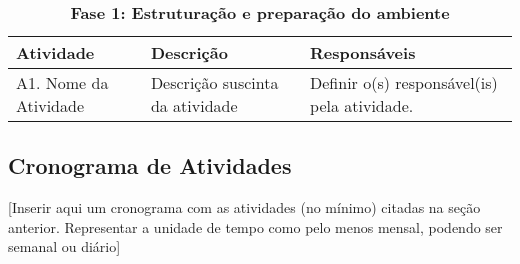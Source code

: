 \begin{table}[htbp]
\centering
\caption{\textbf{Fase 1: Estruturação e preparação do ambiente}}
\begin{tabular}{|p{2.5cm}|p{10cm}|p{2.5cm}|}
\hline
\textbf{Atividade} & \textbf{Descrição} & \textbf{Responsáveis} \\ \hline
A1. Nome da Atividade & Descrição suscinta da atividade & Definir o(s) responsável(is) pela atividade. \\ \hline
\end{tabular}
\label{}
\end{table}


\subsection{Cronograma de Atividades} %
\label{sub:cronograma_de_atividades}

[Inserir aqui um cronograma com as atividades (no mínimo) citadas na seção anterior. Representar a unidade de tempo como pelo menos mensal, podendo ser semanal ou diário]